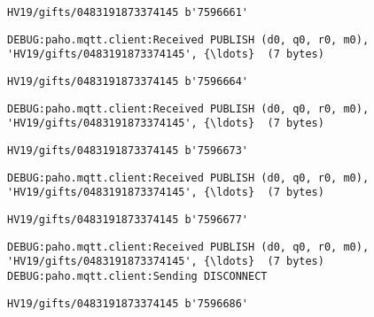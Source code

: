 \documentclass[11pt]{article}
\begin{document}
    \begin{Verbatim}[commandchars=\\\{\}]
HV19/gifts/0483191873374145 b'7596661'
    \end{Verbatim}

    \begin{Verbatim}[commandchars=\\\{\}]
DEBUG:paho.mqtt.client:Received PUBLISH (d0, q0, r0, m0),
'HV19/gifts/0483191873374145', {\ldots}  (7 bytes)
    \end{Verbatim}

    \begin{Verbatim}[commandchars=\\\{\}]
HV19/gifts/0483191873374145 b'7596664'
    \end{Verbatim}

    \begin{Verbatim}[commandchars=\\\{\}]
DEBUG:paho.mqtt.client:Received PUBLISH (d0, q0, r0, m0),
'HV19/gifts/0483191873374145', {\ldots}  (7 bytes)
    \end{Verbatim}

    \begin{Verbatim}[commandchars=\\\{\}]
HV19/gifts/0483191873374145 b'7596673'
    \end{Verbatim}

    \begin{Verbatim}[commandchars=\\\{\}]
DEBUG:paho.mqtt.client:Received PUBLISH (d0, q0, r0, m0),
'HV19/gifts/0483191873374145', {\ldots}  (7 bytes)
    \end{Verbatim}

    \begin{Verbatim}[commandchars=\\\{\}]
HV19/gifts/0483191873374145 b'7596677'
    \end{Verbatim}

    \begin{Verbatim}[commandchars=\\\{\}]
DEBUG:paho.mqtt.client:Received PUBLISH (d0, q0, r0, m0),
'HV19/gifts/0483191873374145', {\ldots}  (7 bytes)
DEBUG:paho.mqtt.client:Sending DISCONNECT
    \end{Verbatim}

    \begin{Verbatim}[commandchars=\\\{\}]
HV19/gifts/0483191873374145 b'7596686'
    \end{Verbatim}
\end{document}
